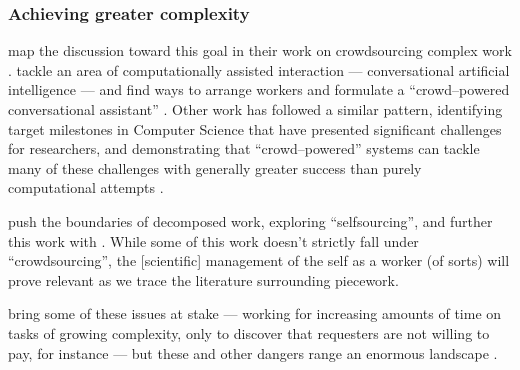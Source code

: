 \documentclass[trackingWork]{subfiles}
\begin{document}
\subsubsection{Achieving greater complexity}\label{sec:Complexity}
\citeauthor{crowdForgeKittur}
map the discussion toward this goal in their work on
crowdsourcing complex work
\cite{crowdForgeKittur}.
\citeauthor{Lasecki:2013:CCC:2501988.2502057} tackle an area of computationally assisted interaction
--- conversational artificial intelligence ---
and find ways to arrange workers and formulate a ``crowd--powered conversational assistant''
\cite{Lasecki:2013:CCC:2501988.2502057}.
Other work has followed a similar pattern,
identifying target milestones in Computer Science
that have presented significant challenges for researchers,
and demonstrating that ``crowd--powered'' systems can tackle many of these challenges
with generally greater success than purely computational attempts
\cite[][and others]{Lasecki:2013:RCL:2441776.2441912,foundry}.


\citeauthor{selfsourcingTeevan2014} push the boundaries of decomposed work,
exploring ``selfsourcing'', and further this work with \citeauthor{selfsourcingTeevan2016}
\cite{selfsourcingTeevan2014,selfsourcingTeevan2016}.
While some of this work doesn't strictly fall under ``crowdsourcing'',
the [scientific] management of the self as a worker
(of sorts)
will prove relevant as we trace the literature surrounding piecework.

\citeauthor{professionalCrowdworkEthics} bring some of these issues at stake
--- working for increasing amounts of time on tasks of growing complexity, only to discover that requesters are not willing to pay,
for instance ---
but these and other dangers range an enormous landscape %
\cite{crowdworkFuture,professionalCrowdworkEthics,nickerson2013crowd,dynamo}.
\end{document}
